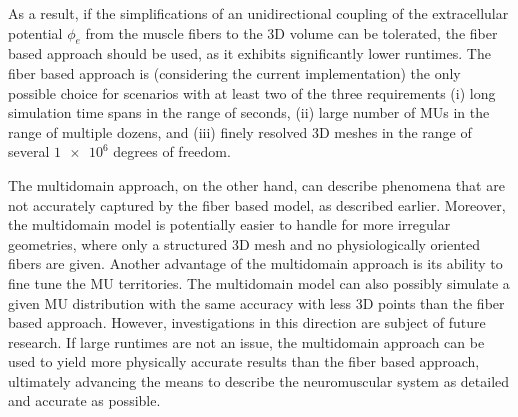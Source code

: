 As a result, if the simplifications of an unidirectional coupling of the extracellular potential $\phi_e$ from the muscle fibers to the 3D volume can be tolerated, the fiber based approach should be used, as it exhibits significantly lower runtimes. The fiber based approach is (considering the current implementation) the only possible choice for scenarios with at least two of the three requirements (i) long simulation time spans in the range of seconds, (ii) large number of MUs in the range of multiple dozens, and (iii) finely resolved 3D meshes in the range of several $\num{1e6}$ degrees of freedom.
 
The multidomain approach, on the other hand, can describe phenomena that are not accurately captured by the fiber based model, as described earlier.
Moreover, the multidomain model is potentially easier to handle for more irregular geometries, where only a structured 3D mesh and no physiologically oriented fibers are given. Another advantage of the multidomain approach is its ability to fine tune the MU territories. 
The multidomain model can also possibly simulate a given MU distribution with the same accuracy with less 3D points than the fiber based approach. However, investigations in this direction are subject of future research.
If large runtimes are not an issue, the multidomain approach can be used to yield more physically accurate results than the fiber based approach, ultimately advancing the means to describe the neuromuscular system as detailed and accurate as possible.







